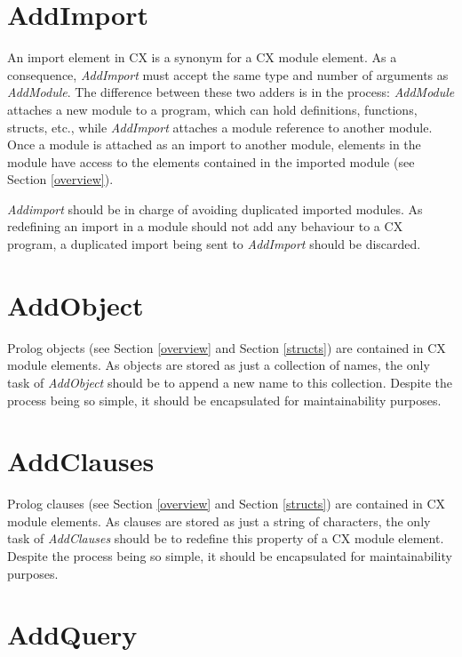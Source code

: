\section{AddImport}
\label{addimport}

An import element in CX is a synonym for a CX module element. As a consequence,
\textit{AddImport} must accept the same type and number of arguments as
\textit{AddModule}. The difference between these two adders is in the process:
\textit{AddModule} attaches a new module to a program, which can hold
definitions, functions, structs, etc., while \textit{AddImport}  attaches a
module reference to another module. Once a module is attached as an import to
another module, elements in the module have access to the elements contained in
the imported module (see Section \ref{overview}).

\textit{Addimport} should be in charge of avoiding duplicated imported
modules. As redefining an import in a module should not add any behaviour to a
CX program, a duplicated import being sent to \textit{AddImport} should be
discarded.

\section{AddObject}
\label{addobject}

Prolog objects (see Section \ref{overview} and Section \ref{structs}) are
contained in CX module elements. As objects are stored as just a collection of
names, the only task of \textit{AddObject} should be to append a new name to
this collection. Despite the process being so simple, it should be encapsulated
for maintainability purposes.

\section{AddClauses}
\label{addclauses}

Prolog clauses (see Section \ref{overview} and Section \ref{structs}) are
contained in CX module elements. As clauses are stored as just a string of
characters, the only task of \textit{AddClauses} should be to redefine this
property of a CX module element. Despite the process being so simple, it should
be encapsulated for maintainability purposes.

\section{AddQuery}
\label{addquery}

